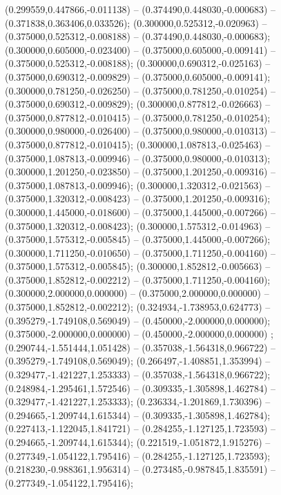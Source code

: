  (0.299559,0.447866,-0.011138) -- (0.374490,0.448030,-0.000683) -- (0.371838,0.363406,0.033526);
 (0.300000,0.525312,-0.020963) -- (0.375000,0.525312,-0.008188) -- (0.374490,0.448030,-0.000683);
 (0.300000,0.605000,-0.023400) -- (0.375000,0.605000,-0.009141) -- (0.375000,0.525312,-0.008188);
 (0.300000,0.690312,-0.025163) -- (0.375000,0.690312,-0.009829) -- (0.375000,0.605000,-0.009141);
 (0.300000,0.781250,-0.026250) -- (0.375000,0.781250,-0.010254) -- (0.375000,0.690312,-0.009829);
 (0.300000,0.877812,-0.026663) -- (0.375000,0.877812,-0.010415) -- (0.375000,0.781250,-0.010254);
 (0.300000,0.980000,-0.026400) -- (0.375000,0.980000,-0.010313) -- (0.375000,0.877812,-0.010415);
 (0.300000,1.087813,-0.025463) -- (0.375000,1.087813,-0.009946) -- (0.375000,0.980000,-0.010313);
 (0.300000,1.201250,-0.023850) -- (0.375000,1.201250,-0.009316) -- (0.375000,1.087813,-0.009946);
 (0.300000,1.320312,-0.021563) -- (0.375000,1.320312,-0.008423) -- (0.375000,1.201250,-0.009316);
 (0.300000,1.445000,-0.018600) -- (0.375000,1.445000,-0.007266) -- (0.375000,1.320312,-0.008423);
 (0.300000,1.575312,-0.014963) -- (0.375000,1.575312,-0.005845) -- (0.375000,1.445000,-0.007266);
 (0.300000,1.711250,-0.010650) -- (0.375000,1.711250,-0.004160) -- (0.375000,1.575312,-0.005845);
 (0.300000,1.852812,-0.005663) -- (0.375000,1.852812,-0.002212) -- (0.375000,1.711250,-0.004160);
 (0.300000,2.000000,0.000000) -- (0.375000,2.000000,0.000000) -- (0.375000,1.852812,-0.002212);
 (0.324934,-1.738953,0.624773) -- (0.395279,-1.749108,0.569049) -- (0.450000,-2.000000,0.000000);
 (0.375000,-2.000000,0.000000) -- (0.450000,-2.000000,0.000000) ;
 (0.290744,-1.551444,1.051428) -- (0.357038,-1.564318,0.966722) -- (0.395279,-1.749108,0.569049);
 (0.266497,-1.408851,1.353994) -- (0.329477,-1.421227,1.253333) -- (0.357038,-1.564318,0.966722);
 (0.248984,-1.295461,1.572546) -- (0.309335,-1.305898,1.462784) -- (0.329477,-1.421227,1.253333);
 (0.236334,-1.201869,1.730396) -- (0.294665,-1.209744,1.615344) -- (0.309335,-1.305898,1.462784);
 (0.227413,-1.122045,1.841721) -- (0.284255,-1.127125,1.723593) -- (0.294665,-1.209744,1.615344);
 (0.221519,-1.051872,1.915276) -- (0.277349,-1.054122,1.795416) -- (0.284255,-1.127125,1.723593);
 (0.218230,-0.988361,1.956314) -- (0.273485,-0.987845,1.835591) -- (0.277349,-1.054122,1.795416);
